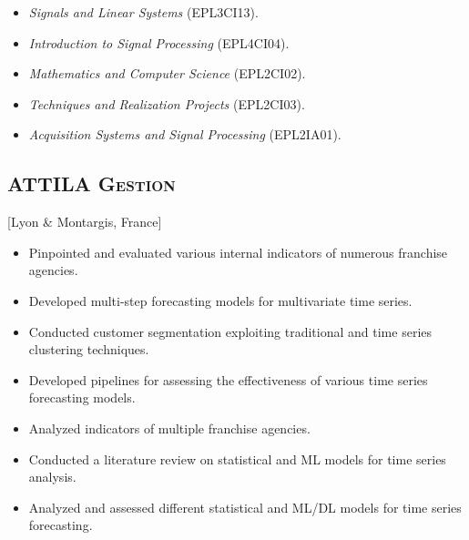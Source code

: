 \documentclass{mycv}
\begin{document}
\begin{itemize}
  \itemsep 0em
  \item \textit{Signals and Linear Systems} (EPL3CI13).
  \item \textit{Introduction to Signal Processing} (EPL4CI04).
  \item \textit{Mathematics and Computer Science} (EPL2CI02).
  \item \textit{Techniques and Realization Projects} (EPL2CI03).
  \item \textit{Acquisition Systems and Signal Processing} (EPL2IA01).
\end{itemize}

\subsection{\scshape ATTILA Gestion}[Lyon \& Montargis, France]

\begin{positions}
\end{positions}

\begin{itemize}
  \itemsep 0em
  \item Pinpointed and evaluated various internal indicators of numerous franchise agencies.
  \item Developed multi-step forecasting models for multivariate time series.
  \item Conducted customer segmentation exploiting traditional and time series clustering techniques.
  \item Developed pipelines for assessing the effectiveness of various time series forecasting models.
\end{itemize}

\begin{positions}
\end{positions}

\begin{itemize}
  \itemsep 0em
  \item Analyzed indicators of multiple franchise agencies.
  \item Conducted a literature review on statistical and ML models for time series analysis.
  \item Analyzed and assessed different statistical and ML/DL models for time series forecasting.
\end{itemize}
\end{document}
